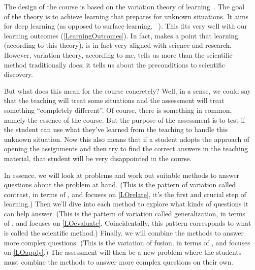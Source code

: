 \begin{frame}
\begin{remark}
\begin{columns}[T]
\begin{column}{0.4\columnwidth}
        \end{column}
      \end{columns}
  \end{remark}
\end{frame}

The design of the course is based on the variation theory of learning~\cite[see 
\eg][]{NecessaryConditionsOfLearning}.
The goal of the theory is to achieve learning that prepares for unknown 
situations.
It aims for deep learning (as opposed to surface learning, 
\cf~\cite{DeepSurfaceLearning}).
This fits very well with our learning outcomes (\cref{LearningOutcomes}).
In fact, \textcite{NecessaryConditionsOfLearning} makes a point that learning 
(according to this theory), is in fact very aligned with science and research.
However, variation theory, according to me, tells us more than the scientific 
method traditionally does; it tells us about the preconditions to scientific 
discovery.

But what does this mean for the course concretely?
Well, in a sense, we could say that the teaching will treat some situations and 
the assessment will treat something \enquote{completely different}.
Of course, there is something in common, namely the essence of the course.
But the purpose of the assessment is to test if the student can use what 
they've learned from the teaching to handle this unknown situation.
Now this also means that if a student adopts the approach of opening the 
assignments and then try to find the correct answers in the teaching material, 
that student will be very disappointed in the course.

In essence, we will look at problems and work out suitable methods to answer 
questions about the problem at hand.
(This is the pattern of variation called contrast, in terms of 
\cite{NecessaryConditionsOfLearning}, and focuses on \ref{LOrelate}, it's the 
first and crucial step of learning.)
Then we'll dive into each method to explore what kinds of questions it can help 
answer.
(This is the pattern of variation called generalization, in terms of 
\cite{NecessaryConditionsOfLearning}, and focuses on \ref{LOevaluate}.
Coincidentally, this pattern corresponds to what is called the scientific 
method.)
Finally, we will combine the methods to answer more complex questions.
(This is the variation of fusion, in terms of 
\cite{NecessaryConditionsOfLearning}, and focuses on \ref{LOapply}.)
The assessment will then be a new problem where the students must combine the 
methods to answer more complex questions on their own.

